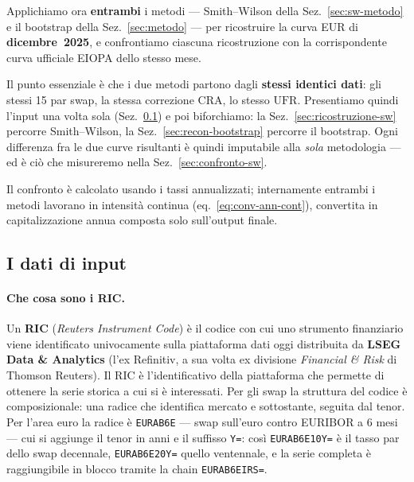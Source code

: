 \documentclass[11pt,a4paper]{article}
\theoremstyle{plain}
\theoremstyle{definition}
\theoremstyle{remark}
\newcommand{\UFR}{\mathrm{UFR}}
\begin{document}
Applichiamo ora \textbf{entrambi} i metodi --- Smith--Wilson della Sez.~\ref{sec:sw-metodo} e
il bootstrap della Sez.~\ref{sec:metodo} --- per ricostruire la curva EUR di
\textbf{dicembre~2025}, e confrontiamo ciascuna ricostruzione con la corrispondente curva
ufficiale EIOPA dello stesso mese.

Il punto essenziale \`e che i due metodi partono dagli \textbf{stessi identici dati}: gli
stessi 15 par swap, la stessa correzione CRA, lo stesso $\UFR$. Presentiamo quindi l'input
una volta sola (Sez.~\ref{sec:dati-input-dic}) e poi biforchiamo: la
Sez.~\ref{sec:ricostruzione-sw} percorre Smith--Wilson, la
Sez.~\ref{sec:recon-bootstrap} percorre il bootstrap. Ogni differenza fra le due curve
risultanti \`e quindi imputabile alla \emph{sola} metodologia --- ed \`e ci\`o che
misureremo nella Sez.~\ref{sec:confronto-sw}.

Il confronto è calcolato usando i tassi annualizzati; internamente entrambi i metodi lavorano
in intensità continua (eq.~\eqref{eq:conv-ann-cont}), convertita in capitalizzazione annua
composta solo sull'output finale.

\subsection{I dati di input}
\label{sec:dati-input-dic}

\paragraph{Che cosa sono i RIC.}
Un \textbf{RIC} (\emph{Reuters Instrument Code}) \`e il codice con cui uno strumento
finanziario viene identificato univocamente sulla piattaforma dati oggi distribuita da
\textbf{LSEG Data \& Analytics} (l'ex Refinitiv, a sua volta ex divisione \emph{Financial \&
Risk} di Thomson Reuters). Il RIC \`e l'identificativo della piattaforma che permette di ottenere la serie storica a cui si è interessati. Per gli swap la struttura del codice \`e composizionale: una radice che
identifica mercato e sottostante, seguita dal tenor. Per l'area euro la radice \`e
\texttt{EURAB6E} --- swap sull'euro contro EURIBOR a 6 mesi --- cui si aggiunge il tenor in
anni e il suffisso \texttt{Y=}: cos\`i \texttt{EURAB6E10Y=} \`e il tasso par dello swap
decennale, \texttt{EURAB6E20Y=} quello ventennale, e la serie completa \`e raggiungibile in
blocco tramite la chain \texttt{EURAB6EIRS=}.
\end{document}
